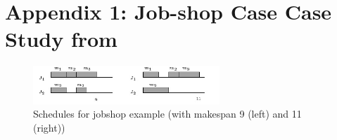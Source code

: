 \documentclass{llncs}
\newcommand{\Ko}{K}
\newcommand{\IM}{\mathit{IM}}
\newcommand{\imitator}{\textsc{Imitator}}
\newcommand{\commentaire}[1]{\textcolor{red}{\textbf{$\Leftarrow$  #1 $\Rightarrow$}}}
\begin{document}








\newpage


\appendix

\section*{Appendix 1: Job-shop Case Case Study from \cite{AM02}}






\begin{figure}[ht!]
	\centering
 		\includegraphics[width=7cm]{./figures/scheduling.jpg}
	\caption{Schedules for jobshop example (with makespan 9 (left) and 11 (right)) \cite{AM02}}
	\label{fig:schedules_maler}
\end{figure}
\end{document}
